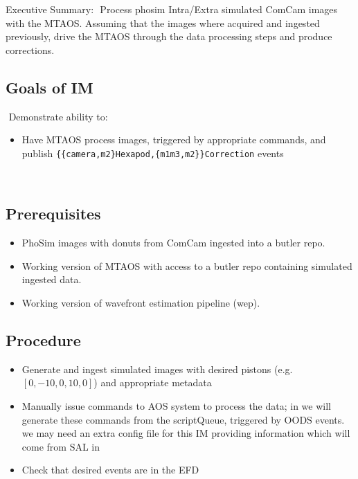 Executive Summary:
​
Process phosim Intra/Extra simulated ComCam images with the MTAOS.
Assuming that the images where acquired and ingested previously, drive the MTAOS through the data processing steps and produce corrections.
​
\subsection{Goals of IM}
​
Demonstrate ability to:
​
\begin{itemize}
\item Have MTAOS process images, triggered by appropriate commands, and publish
  \texttt{\{\{camera,m2\}Hexapod,\{m1m3,m2\}\}Correction} events
\end{itemize}
​
\subsection{Prerequisites}
\begin{itemize}
\item PhoSim images with donuts from ComCam ingested into a butler repo.
\item Working version of MTAOS with access to a butler repo containing simulated ingested data.
\item Working version of wavefront estimation pipeline (wep). 
\end{itemize}

\subsection{Procedure}
\begin{itemize}
\item Generate and ingest simulated images with desired pistons (e.g. $[0, -10, 0, 10, 0]$) and appropriate
  metadata
\item Manually issue commands to AOS system to process the data; in  we will generate these
  commands from the \gls{scriptQueue}, triggered by \gls{OODS} events.
    \Nb we may need an extra config file for this IM providing information which will
    come from SAL in 
\item Check that desired events are in the EFD
\end{itemize}
